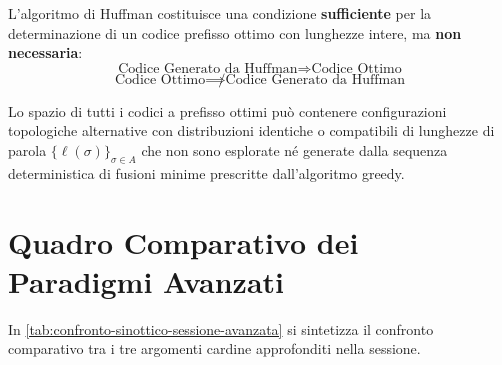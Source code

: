 \begin{corollary}
L'algoritmo di Huffman costituisce una condizione \textbf{sufficiente} per la determinazione di un codice prefisso ottimo con lunghezze intere, ma \textbf{non necessaria}:
\begin{equation}
  \text{Codice Generato da Huffman} \Longrightarrow \text{Codice Ottimo}
\end{equation}
\begin{equation}
  \text{Codice Ottimo} \not\implies \text{Codice Generato da Huffman}
\end{equation}
\end{corollary}

Lo spazio di tutti i codici a prefisso ottimi pu\`o contenere configurazioni topologiche alternative con distribuzioni identiche o compatibili di lunghezze di parola $\{\ell(\sigma)\}_{\sigma \in A}$ che non sono esplorate n\'e generate dalla sequenza deterministica di fusioni minime prescritte dall'algoritmo greedy.

\FloatBarrier
\section[Quadro Comparativo e Metodologico]{Quadro Comparativo dei Paradigmi Avanzati}
\label{sec:quadro-comparativo-avanzato}

In \autoref{tab:confronto-sinottico-sessione-avanzata} si sintetizza il confronto comparativo tra i tre argomenti cardine approfonditi nella sessione.

